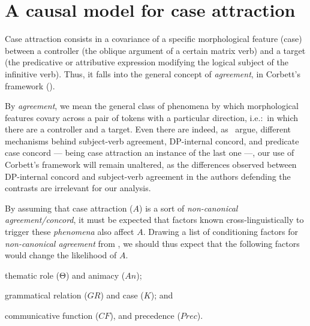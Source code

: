 \documentclass[a4paper, 12pt, article]{memoir}
\begin{document}

\chapter{A causal model for case attraction} %

Case attraction consists in a covariance of a specific morphological feature
(case) between a controller (the oblique argument of a certain matrix verb)
and a target (the predicative or attributive expression modifying the logical
subject of the infinitive verb). Thus, it falls into the general concept of
\emph{agreement}, in Corbett's framework (\citeyear[pp.\ 4--7]{Corbett2006}).

By \emph{agreement}, we mean the general class of phenomena by which
morphological features covary across a pair of tokens with a particular
direction, i.e.:\ in which there are a controller and a target. Even there are
indeed, as~\textcite{Norris2014,Norris2017b,Polinsky2016} argue, different mechanisms
behind subject-verb agreement, DP-internal concord, and predicate case
concord --- being case attraction an instance of the last one ---, our use of
Corbett's framework will remain unaltered, as the differences observed between
DP-internal concord and subject-verb agreement in the authors defending the
contrasts are irrelevant for our analysis.



By assuming that case attraction ($A$) is a sort of \emph{non\hyp{}canonical
	agreement/concord}, it must be expected that factors known
cross\hyp{}linguistically to trigger these \emph{phenomena} also affect $A$.
Drawing a list of conditioning factors for \emph{non-canonical agreement} from
\textcite[176--205]{Corbett2006}, we should thus expect that the following
factors would change the likelihood of $A$.
\begin{inparaenum}
	\item thematic role (Θ) and animacy ($An$);
	\item grammatical relation ($GR$) and case ($K$); and
	\item communicative function ($CF$), and precedence ($Prec$).
\end{inparaenum}



\renewcommand*{\mkbibnamefamily}[1]{\textsc{#1}}
\printbibliography%
\renewcommand*{\mkbibnamefamily}[1]{#1}
\end{document}
